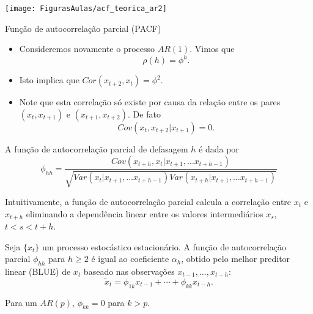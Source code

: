 \documentclass[
  letterpaper,
  DIV=11,
  numbers=noendperiod]{scrreprt}
\theoremstyle{definition}
\theoremstyle{plain}
\theoremstyle{definition}
\theoremstyle{plain}
\theoremstyle{remark}
\begin{document}
\begin{frame}
    \begin{center}
\texttt{[image: FigurasAulas/acf\_teorica\_ar2]}
\end{center}
\end{frame}

\begin{frame}{Função de autocorrelação parcial (PACF)}
    \begin{itemize}
        \item   Consideremos novamente o processo $AR(1)$. Vimos que
        $$\rho(h)=\phi^h.$$
        \item Isto implica que $Cor(x_{t+2},x_t)=\phi^2$.
        \item Note que esta correlação só existe por causa da relação entre os pares $(x_t,x_{t+1})$ e $(x_{t+1},x_{t+2})$. De fato
        $$Cov(x_t,x_{t+2}|x_{t+1})=0.$$         
    \end{itemize}
\end{frame}

\begin{frame}
\begin{defi}
    A função de autocorrelação parcial de defasagem $h$ é dada por
    $$\phi_{hh}=\frac{Cov\left(x_{t+h},x_t|x_{t+1},\ldots x_{t+h-1}\right)}{\sqrt{Var\left(x_t|x_{t+1},\ldots x_{t+h-1}\right)Var\left(x_{t+h}|x_{t+1},\ldots x_{t+h-1}\right)}}$$
\end{defi}

Intuitivamente, a função de autocorrelação parcial calcula a correlação entre $x_t$ e $x_{t+h}$ eliminando a dependência linear entre os valores intermediários $x_s$, $t<s<t+h$.
\end{frame}

\begin{frame}
    \begin{teo}
        Seja $\{x_t\}$ um processo estocástico estacionário. A função de autocorrelação parcial $\phi_{hh}$ para $h\geq 2$
        é igual ao coeficiente $\alpha_h$, obtido pelo melhor preditor linear (BLUE) de $x_t$ baseado nas observações $x_{t-1},\ldots,x_{t-h}$:
        \begin{equation}
        \tilde{x}_t = \phi_{1k}x_{t-1}+\cdots+\phi_{kk}x_{t-h}.
        \end{equation}
    \end{teo}
    
    \begin{teo}
        Para um $AR(p)$, $\phi_{kk}=0$ para $k>p$.
    \end{teo}
\end{frame}
\end{document}
